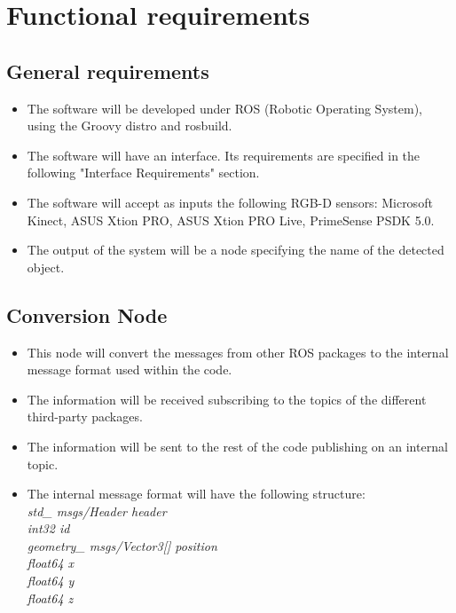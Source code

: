 \documentclass{article}
\begin{document}
\section{Functional requirements}

\subsection{General requirements}
\begin{itemize}

\item The software will be developed under ROS (Robotic Operating System), using the Groovy distro and rosbuild.
\item The software will have an interface. Its requirements are specified in the following "Interface Requirements" section. 
\item The software will accept as inputs the following RGB-D sensors: Microsoft Kinect, ASUS Xtion PRO, ASUS Xtion PRO Live, PrimeSense PSDK 5.0.
\item The output of the system will be a node specifying the name of the detected object. 
 
\end{itemize}
 
\subsection{Conversion Node}
\begin{itemize}
\item This node will convert the messages from other ROS packages to the internal message format used within the code. 
\item The information will be received subscribing to the topics of the different third-party packages. 
\item The information will be sent to the rest of the code publishing on an internal topic. 
\item The internal message format will have the following structure: \\[0.3cm]
\textit{
std\_ msgs/Header header\\[0.1cm]
int32 id\\[0.1cm]
geometry\_ msgs/Vector3[] position\\
\hspace*{0.5cm}float64 x\\
\hspace*{0.5cm}float64 y\\
\hspace*{0.5cm}float64 z\\
}
\end{itemize}
\end{document}
